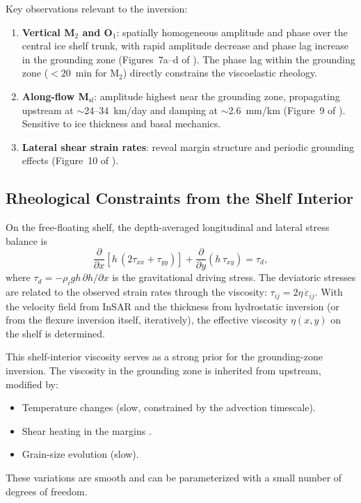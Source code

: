 \documentclass[11pt,letterpaper]{article}
\newcommand{\dd}[2]{\frac{\partial #1}{\partial #2}}
\begin{document}
Key observations relevant to the inversion:
\begin{enumerate}
  \item \textbf{Vertical M$_2$ and O$_1$}: spatially homogeneous amplitude and phase over the central ice shelf trunk, with rapid amplitude decrease and phase lag increase in the grounding zone (Figures~7a--d of \citealt{Minchew2017}).  The phase lag within the grounding zone ($< 20$~min for M$_2$) directly constrains the viscoelastic rheology.
  \item \textbf{Along-flow M$_{\text{sf}}$}: amplitude highest near the grounding zone, propagating upstream at $\sim$24--34~km/day and damping at $\sim$2.6~mm/km (Figure~9 of \citealt{Minchew2017}).  Sensitive to ice thickness and basal mechanics.
  \item \textbf{Lateral shear strain rates}: reveal margin structure and periodic grounding effects (Figure~10 of \citealt{Minchew2017}).
\end{enumerate}

\subsection{Rheological Constraints from the Shelf Interior}
\label{sec:shelf_rheology}

On the free-floating shelf, the depth-averaged longitudinal and lateral stress balance is
\begin{equation}
  \dd{}{x}\!\left[h\,(2\tau_{xx} + \tau_{yy})\right] + \dd{}{y}(h\,\tau_{xy}) = \tau_d,
\end{equation}
where $\tau_d = -\rho_i g h\,\partial h/\partial x$ is the gravitational driving stress.  The deviatoric stresses are related to the observed strain rates through the viscosity: $\tau_{ij} = 2\eta\,\dot{\varepsilon}_{ij}$.  With the velocity field from InSAR and the thickness from hydrostatic inversion (or from the flexure inversion itself, iteratively), the effective viscosity $\eta(x,y)$ on the shelf is determined.

This shelf-interior viscosity serves as a strong prior for the grounding-zone inversion.  The viscosity in the grounding zone is inherited from upstream, modified by:
\begin{itemize}
  \item Temperature changes (slow, constrained by the advection timescale).
  \item Shear heating in the margins \citep{Perol2015,Suckale2014}.
  \item Grain-size evolution (slow).
\end{itemize}
These variations are smooth and can be parameterized with a small number of degrees of freedom.
\end{document}
